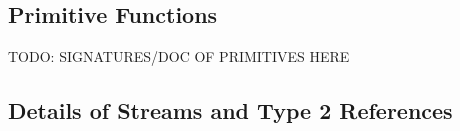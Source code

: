 \subsection{Primitive Functions}
\label{sec:appendix1}

\begin{code}
  TODO: SIGNATURES/DOC OF PRIMITIVES HERE
\end{code}

\subsection{Details of Streams and Type 2 References }


   
